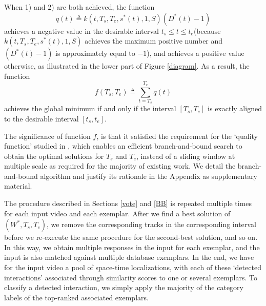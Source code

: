 When 1) and 2) are both achieved, the function
\begin{equation}
q(t)\triangleq k(t, T_{s},T_{e}, s^{*}(t), 1,S)(D^{*}(t)-1)
\label{qfunction}
\end{equation}
achieves a negative value in the desirable interval $t_{s}\le t\le t_{e}$(because $k(t, T_{s},T_{e}, s^{*}(t), 1,S)$ achieves the maximum positive number and $(D^{*}(t)-1)$ is approximately equal to $-1$), and achieves a positive value otherwise, as illustrated in the lower part of Figure \ref{diagram}. As a result, the function
\begin{equation}
\label{quality}
f(T_{s}, T_{e})\triangleq\sum^{T_{e}}_{t=T_{s}}q(t)
\end{equation}
achieves the global minimum if and only if the interval $[T_{s}, T_{e}]$ is exactly aligned to the desirable interval $[t_{s}, t_{e}]$. 

The significance of function $f$, is that it satisfied the requirement for the `quality function' studied in \cite{Lampert}, which enables an efficient branch-and-bound search to obtain the optimal solutions for $T_{s}$ and $T_{e}$, instead of a sliding window at multiple scale as required for the majority of existing work. We detail the branch-and-bound algorithm and justify its rationale in the Appendix as supplementary material.


The procedure described in Sections \ref{vote} and \ref{BB} is repeated multiple times for each input video and each exemplar. After we find a best solution of $(W^{*}, T_{s}, T_{e})$, we remove the corresponding tracks in the corresponding interval before we re-execute the same procedure for the second-best solution, and so on. In this way, we obtain multiple responses in the input for each exemplar, and  the input is also matched against multiple database exemplars. In the end, we have for the input video a pool of space-time localizations, with each of these `detected interactions' associated through similarity scores to one or several exemplars. To classify a detected interaction, we simply apply the majority of the category labels of the top-ranked associated exemplars.

